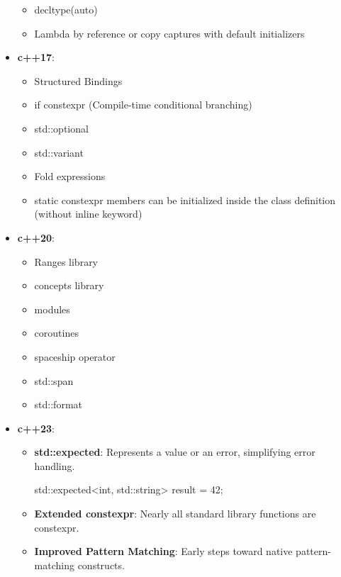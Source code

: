 \documentclass{report}
\begin{document}
\begin{itemize}
\begin{itemize}
            \item decltype(auto)
            \item Lambda by reference or copy captures with default initializers
        \end{itemize}
    \item \textbf{c++17}: 
        \begin{itemize}
            \item Structured Bindings
            \item if constexpr (Compile-time conditional branching)
            \item std::optional
            \item std::variant
            \item Fold expressions
            \item static constexpr members can be initialized inside the class definition (without inline keyword)
        \end{itemize}
    \item \textbf{c++20}: 
        \begin{itemize}
            \item Ranges library
            \item concepts library
            \item modules
            \item coroutines
            \item spaceship operator
            \item std::span
            \item std::format
        \end{itemize}
    \item \textbf{c++23}: 
        \begin{itemize}
            \item \textbf{std::expected}: Represents a value or an error, simplifying error handling.
                \bigbreak \noindent 
                \begin{cppcode}
                std::expected<int, std::string> result = 42;
                \end{cppcode}
            \item \textbf{Extended constexpr}: Nearly all standard library functions are constexpr.
            \item \textbf{Improved Pattern Matching}: Early steps toward native pattern-matching constructs.
        \end{itemize}
\end{itemize}

























    
\end{document}
